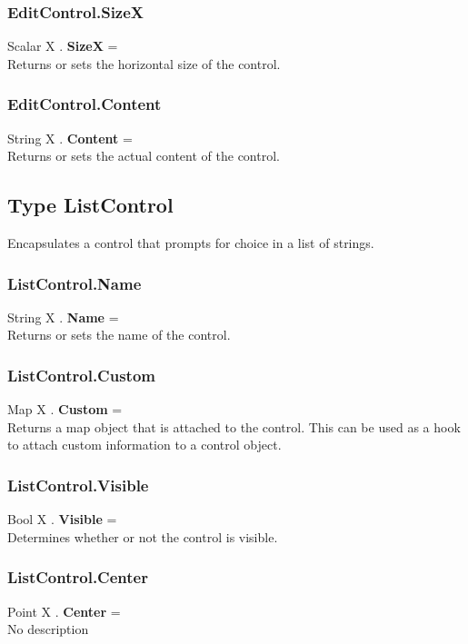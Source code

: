 \subsubsection{EditControl.SizeX \label{F:EditControl:SizeX}}
Scalar X . \textbf{SizeX} = \\
Returns or sets the horizontal size of the control.

\subsubsection{EditControl.Content \label{F:EditControl:Content}}
String X . \textbf{Content} = \\
Returns or sets the actual content of the control.

\subsection{Type ListControl \label{T:ListControl}}
Encapsulates a control that prompts for choice in a list of strings.

\subsubsection{ListControl.Name \label{F:ListControl:Name}}
String X . \textbf{Name} = \\
Returns or sets the name of the control.

\subsubsection{ListControl.Custom \label{F:ListControl:Custom}}
Map X . \textbf{Custom} = \\
Returns a map object that is attached to the control. This can be used as a hook to attach custom information to a control object.

\subsubsection{ListControl.Visible \label{F:ListControl:Visible}}
Bool X . \textbf{Visible} = \\
Determines whether or not the control is visible.

\subsubsection{ListControl.Center \label{F:ListControl:Center}}
Point X . \textbf{Center} = \\
No description


